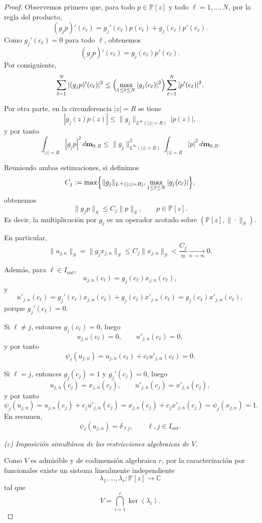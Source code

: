 \documentclass[12pt,a4paper]{article}
\theoremstyle{definition}
\theoremstyle{remark}
\newcommand{\Poly}{\mathbb{P}[z]}
\begin{document}
\begin{proof}
  Observemos primero que, para todo $p\in\Poly$ y todo $\ell=1,\dots,N$,
  por la regla del producto,
  \[
    (g_jp)'(c_\ell)
    =
    g_j'(c_\ell)p(c_\ell)+g_j(c_\ell)p'(c_\ell).
  \]
  Como $g_j'(c_\ell)=0$ para todo $\ell$, obtenemos
  \[
    (g_jp)'(c_\ell)=g_j(c_\ell)p'(c_\ell).
  \]
  Por consiguiente,
  \[
    \sum_{\ell=1}^N |(g_jp)'(c_\ell)|^2
    \le
    \Bigl(\max_{1\le \ell\le N}|g_j(c_\ell)|^2\Bigr)
    \sum_{\ell=1}^N |p'(c_\ell)|^2.
  \]

  Por otra parte, en la circunferencia $|z|=R$ se tiene
  \[
    |g_j(z)p(z)|
    \le
    \|g_j\|_{L^\infty(|z|=R)}\,|p(z)|,
  \]
  y por tanto
  \[
    \int_{|z|=R}|g_jp|^2\,d\mathbf{m}_{0;R}
    \le
    \|g_j\|_{L^\infty(|z|=R)}^2
    \int_{|z|=R}|p|^2\,d\mathbf{m}_{0;R}.
  \]

  Reuniendo ambas estimaciones, si definimos
  \[
    C_j:=
    \max\Bigl\{
    \|g_j\|_{L^\infty(|z|=R)},
    \max_{1\le \ell\le N}|g_j(c_\ell)|
    \Bigr\},
  \]
  obtenemos
  \[
    \|g_jp\|_S\le C_j\|p\|_S,
    \qquad p\in\Poly.
  \]
  Es decir, la multiplicación por $g_j$ es un operador acotado sobre
  $(\Poly,\|\cdot\|_S)$.

  En particular,
  \[
    \|u_{j,n}\|_S=\|g_jx_{j,n}\|_S\le C_j\|x_{j,n}\|_S<\frac{C_j}{n}\xrightarrow[n\to\infty]{}0.
  \]

  Además, para $\ell\in I_{\mathrm{out}}$,
  \[
    u_{j,n}(c_\ell)=g_j(c_\ell)x_{j,n}(c_\ell),
  \]
  y
  \[
    u'_{j,n}(c_\ell)=g_j'(c_\ell)x_{j,n}(c_\ell)+g_j(c_\ell)x'_{j,n}(c_\ell)
    =g_j(c_\ell)x'_{j,n}(c_\ell),
  \]
  porque $g_j'(c_\ell)=0$.

  Si $\ell\neq j$, entonces $g_j(c_\ell)=0$, luego
  \[
    u_{j,n}(c_\ell)=0,
    \qquad
    u'_{j,n}(c_\ell)=0,
  \]
  y por tanto
  \[
    \psi_\ell(u_{j,n})=u_{j,n}(c_\ell)+c_\ell u'_{j,n}(c_\ell)=0.
  \]

  Si $\ell=j$, entonces $g_j(c_j)=1$ y $g_j'(c_j)=0$, luego
  \[
    u_{j,n}(c_j)=x_{j,n}(c_j),
    \qquad
    u'_{j,n}(c_j)=x'_{j,n}(c_j),
  \]
  y por tanto
  \[
    \psi_j(u_{j,n})
    =
    u_{j,n}(c_j)+c_j u'_{j,n}(c_j)
    =
    x_{j,n}(c_j)+c_jx'_{j,n}(c_j)
    =
    \psi_j(x_{j,n})=1.
  \]
  En resumen,
  \[
    \psi_\ell(u_{j,n})=\delta_{\ell j},
    \qquad \ell,j\in I_{\mathrm{out}}.
  \]

  \smallskip
  \noindent
  \emph{(c) Imposición simultánea de las restricciones algebraicas de $V$.}

  Como $V$ es admisible y de codimensión algebraica $r$, por la caracterización por
  funcionales existe un sistema linealmente independiente
  \[
    \lambda_1,\dots,\lambda_r:\Poly\to\mathbb C
  \]
  tal que
  \[
    V=\bigcap_{i=1}^r \ker(\lambda_i).
  \]


\end{proof}
\end{document}
